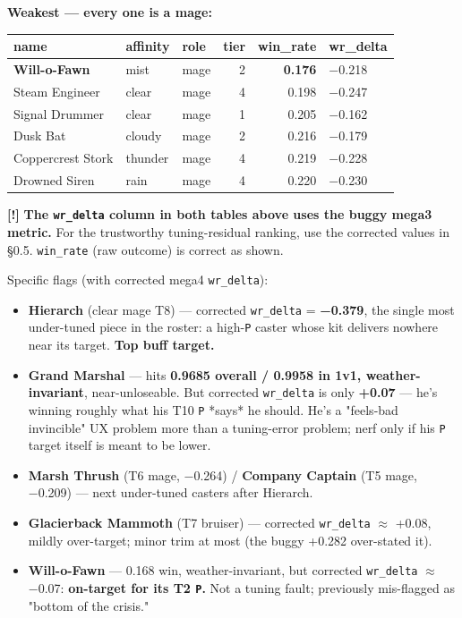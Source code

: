 \documentclass[10pt]{article}
\begin{document}
\textbf{Weakest --- every one is a mage:}\\

\medskip
\begin{tabularx}{\linewidth}{LLLrrL}
\toprule
\textbf{name} & \textbf{affinity} & \textbf{role} & \textbf{tier} & \textbf{win\_rate} & \textbf{wr\_delta} \\
\midrule
\textbf{Will-o-Fawn} & mist & mage & 2 & \textbf{0.176} & −0.218 \\
Steam Engineer & clear & mage & 4 & 0.198 & −0.247 \\
Signal Drummer & clear & mage & 1 & 0.205 & −0.162 \\
Dusk Bat & cloudy & mage & 2 & 0.216 & −0.179 \\
Coppercrest Stork & thunder & mage & 4 & 0.219 & −0.228 \\
Drowned Siren & rain & mage & 4 & 0.220 & −0.230 \\
\bottomrule
\end{tabularx}
\medskip

\begin{quotebox}
\textbf{[!]} \textbf{The \texttt{wr\_\allowbreak{}delta} column in both tables above uses the buggy mega3 metric.} For the trustworthy tuning-residual ranking, use the corrected values in \S{}0.5. \texttt{win\_\allowbreak{}rate} (raw outcome) is correct as shown.
\end{quotebox}

Specific flags (with corrected mega4 \texttt{wr\_\allowbreak{}delta}):\\

\begin{itemize}
\item \textbf{Hierarch} (clear mage T8) --- corrected \texttt{wr\_\allowbreak{}delta} = \textbf{−0.379}, the single most under-tuned piece in the roster: a high-\texttt{P} caster whose kit delivers nowhere near its target. \textbf{Top buff target.}
\item \textbf{Grand Marshal} --- hits \textbf{0.9685 overall / 0.9958 in 1v1, weather-invariant}, near-unloseable. But corrected \texttt{wr\_\allowbreak{}delta} is only \textbf{+0.07} --- he's winning roughly what his T10 \texttt{P} *says* he should. He's a "feels-bad invincible" UX problem more than a tuning-error problem; nerf only if his \texttt{P} target itself is meant to be lower.
\item \textbf{Marsh Thrush} (T6 mage, −0.264) / \textbf{Company Captain} (T5 mage, −0.209) --- next under-tuned casters after Hierarch.
\item \textbf{Glacierback Mammoth} (T7 bruiser) --- corrected \texttt{wr\_\allowbreak{}delta} $\approx$ +0.08, mildly over-target; minor trim at most (the buggy +0.282 over-stated it).
\item \textbf{Will-o-Fawn} --- 0.168 win, weather-invariant, but corrected \texttt{wr\_\allowbreak{}delta} $\approx$ −0.07: \textbf{on-target for its T2 \texttt{P}.} Not a tuning fault; previously mis-flagged as "bottom of the crisis."
\end{itemize}
\end{document}
